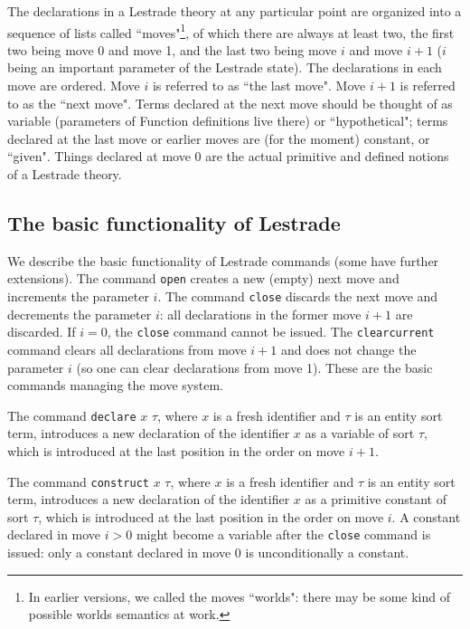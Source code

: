 \documentclass[submission,copyright,creativecommons]{eptcs}
\begin{document}
The declarations in a Lestrade theory at any particular point are organized into a sequence of lists
called ``moves"\footnote{In earlier versions,  we called the moves ``worlds":  there may be some kind of possible worlds semantics at work.}, of which there are always at least two, the first two being move 0 and move 1, and the last two being move $i$ and move $i+1$ ($i$ being an important parameter of the Lestrade state).  The declarations in each move are ordered.  Move $i$ is referred to as ``the last move".  Move $i+1$ is referred to as the ``next move".  Terms declared at the next move should be thought of as variable (parameters of Function definitions live there) or ``hypothetical";  terms declared at the last move or earlier moves are (for the moment) constant, or ``given".  Things declared at move 0 are the actual primitive and defined notions of a Lestrade theory.

\subsection{The basic functionality of Lestrade}

We describe the basic functionality of Lestrade commands (some have further extensions). The command {\tt open}
creates a new (empty) next move and increments the parameter $i$.  The command
{\tt close} discards the next move and decrements the parameter $i$:  all declarations in the former move $i+1$ are discarded.  If $i=0$, the {\tt close} command cannot be issued.  The {\tt clearcurrent} command clears all declarations from move $i+1$ and does not change the parameter $i$ (so one can clear declarations from move 1).  These are the basic commands managing the move system.

The command {\tt declare} $x$ $\tau$, where $x$ is a fresh identifier and $\tau$ is an entity sort term, introduces a new declaration of the identifier $x$
as a variable of sort $\tau$, which is introduced at the last position in the order on move $i+1$.

The command {\tt construct} $x$ $\tau$, where $x$ is a fresh identifier and $\tau$ is an entity sort term, introduces a new declaration of the identifier
$x$ as a primitive constant of sort $\tau$, which is introduced at the last position in the order on move $i$.  A constant declared in move $i>0$ might become a variable after the {\tt close} command is issued:  only a constant declared in move 0 is unconditionally a constant.
\end{document}
